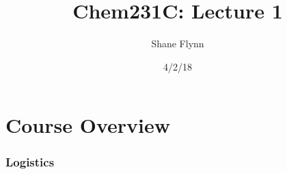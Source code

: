\documentclass{article}
\title{Chem231C: Lecture 1}
\date{4/2/18}
\author{Shane Flynn}
\begin{document}
\maketitle

\section*{Course Overview}


\subsubsection*{Logistics}
\end{document}
